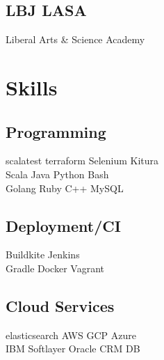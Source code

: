 \documentclass[letterpaper]{resume} %
\begin{document}
\begin{minipage}[t]{0.33\textwidth}

\subsection{LBJ LASA}
Liberal Arts \& Science Academy \\

\sectionspace %


\section{Skills}

\subsection{Programming}

scalatest \textbullet{} terraform \textbullet{} Selenium \textbullet{} Kitura \\
\sectionspace
{}
Scala \textbullet{} Java \textbullet{} Python \textbullet{} Bash \\

\sectionspace
{}
Golang \textbullet{} Ruby \textbullet{} C++ \textbullet{} MySQL \\

\sectionspace

\subsection{Deployment/CI}
Buildkite \textbullet{} Jenkins\\
Gradle \textbullet{} Docker \textbullet{} Vagrant\\ 

\sectionspace %

\subsection{Cloud Services}
elasticsearch \textbullet{} AWS \textbullet{} GCP \textbullet{} Azure\\
IBM Softlayer \textbullet{} Oracle CRM DB\\



\end{minipage}
\end{document}

